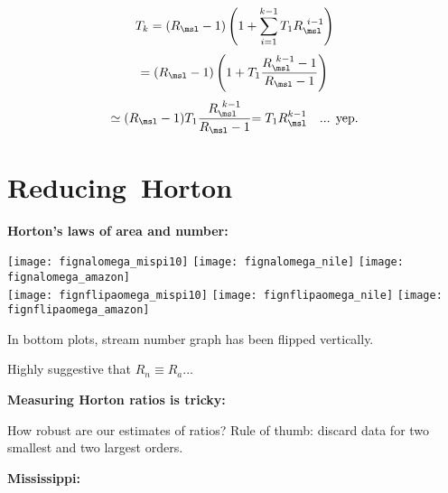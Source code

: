 \begin{frame}[label=]
\begin{frame}[label=]
\begin{frame}[label=]
\begin{frame}[label=]
\begin{frame}[label=]
\begin{frame}[label=]
\begin{frame}[label=]
\begin{frame}[label=]
\begin{frame}[label=]
\begin{frame}[label=]
\begin{frame}[label=]
        $$ 
        T_{k} 
        = 
        (R_\msl-1)
        \left(
          1 + 
          \sum_{i=1}^{k-1} 
          T_1 R_\msl^{\ i-1}
        \right) 
        $$
        { 
          $$ 
          = (R_\msl-1) 
          \left( 1 + 
            T_1\frac{R_\msl^{\ k-1}-1}{R_\msl - 1} 
          \right) 
          $$
        }
        $$ 
        {
          \simeq 
          (R_\msl-1) T_1 \frac{R_\msl^{\ k-1}}{R_\msl - 1} 
        }
        { 
          = T_1 R_\msl^{k-1}  \quad \mbox{... yep.}
        }
        $$
    
  
  


\section{Reducing\ Horton}

\begin{frame}[label=]
  \textbf{Horton's laws of area and number:}

  
    \begin{center}
      \texttt{[image: fignalomega\_mispi10]} 
      \texttt{[image: fignalomega\_nile]} 
      \texttt{[image: fignalomega\_amazon]} \\
      \texttt{[image: fignflipaomega\_mispi10]} 
      \texttt{[image: fignflipaomega\_nile]} 
      \texttt{[image: fignflipaomega\_amazon]} 
    \end{center}
    
     
       In bottom plots, stream number graph has been flipped vertically.
     
      Highly suggestive that $R_n \equiv R_a$...
    
  


\begin{frame}[label=]
  \textbf{Measuring Horton ratios is tricky:}
  
  
   How robust are our estimates of ratios?
   Rule of thumb: discard data for two smallest
    and two largest orders.
  


\begin{frame}[label=]
  \textbf{Mississippi:}


\end{frame}
\end{frame}
\end{frame}
\end{frame}
\end{frame}
\end{frame}
\end{frame}
\end{frame}
\end{frame}
\end{frame}
\end{frame}
\end{frame}
\end{frame}
\end{frame}
